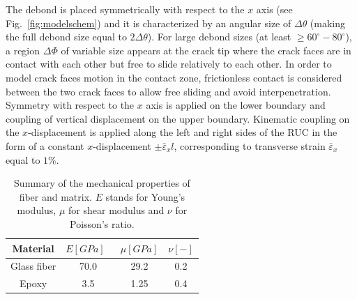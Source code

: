 \documentclass[smallextended]{svjour3}       %
\begin{document}
The debond is placed symmetrically with respect to the $x$ axis (see Fig.~\ref{fig:modelschem}) and it is characterized by an angular size of $\Delta\theta$ (making the full debond size equal to $2\Delta\theta$). For large debond sizes (at least $\geq 60^{\circ}-80^{\circ}$), a region $\Delta\Phi$ of variable size appears at the crack tip where the crack faces are in contact with each other but free to slide relatively to each other. In order to model crack faces motion in the contact zone, frictionless contact is considered between the two crack faces to allow free sliding and avoid interpenetration. Symmetry with respect to the $x$ axis is applied on the lower boundary and coupling of vertical displacement on the upper boundary. Kinematic coupling on the $x$-displacement is applied along the left and right sides of the RUC in the form of a constant $x$-displacement $\pm\bar{\varepsilon}_{x} l$, corresponding to transverse strain $\bar{\varepsilon}_{x}$ equal to $1\%$.

\begin{table}[!htbp]
 \centering
 \caption{Summary of the mechanical properties of fiber and matrix. $E$ stands for Young's modulus, $\mu$ for shear modulus and $\nu$ for Poisson's ratio.}
 \begin{tabular}{cccc}
\textbf{Material} & \textbf{$E\left[GPa\right]$}\ & \textbf{$\mu\left[GPa\right]$} & \textbf{$\nu\left[-\right]$} \\
\midrule
Glass fiber    & 70.0  & 29.2   & 0.2  \\
Epoxy    & 3.5    & 1.25   & 0.4
\end{tabular}
\label{tab:phaseprop}
\end{table}
\end{document}
